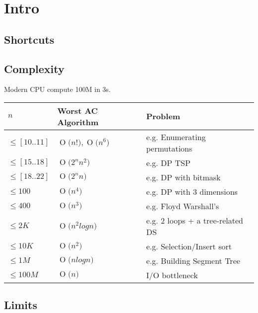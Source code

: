 \documentclass[twocolumn,8pt]{article}
\newcommand{\BigO}[1]{\ensuremath{\operatorname{O}\bigl(#1\bigr)}}
\begin{document}
\thispagestyle{empty}

\makeatletter
{}
\makeatother

\section{Intro}

\subsection{Shortcuts}



\subsection{Complexity}

Modern CPU compute 100M in 3s.

\begin{center}
    \begin{tabular}{ l l p{5cm}}
    \hline
    $n$             &   Worst AC Algorithm              & Problem \\ \hline
    $\leq [10..11]$ &   $\BigO{n!}, \BigO{n^6}$        & e.g. Enumerating permutations \\
    $\leq [15..18]$ &   $\BigO{2^n n^2} $              & e.g. DP TSP\\
    $\leq [18..22]$ &   $\BigO{2^n n} $                & e.g. DP with bitmask \\
    $\leq 100$      &   $\BigO{n^4} $                  & e.g. DP with 3 dimensions \\
    $\leq 400$      &   $\BigO{n^3} $                  & e.g. Floyd Warshall's \\
    $\leq 2K$       &   $\BigO{n^2 log n} $            & e.g. 2 loops + a tree-related DS \\
    $\leq 10K$      &   $\BigO{n^2} $                  & e.g. Selection/Insert sort \\
    $\leq 1M$       &   $\BigO{n log n} $              & e.g. Building Segment Tree  \\
    $\leq 100M$     &   $\BigO{n} $                    & I/O bottleneck \\
    \end{tabular}
\end{center}

\subsection{Limits}
\end{document}
